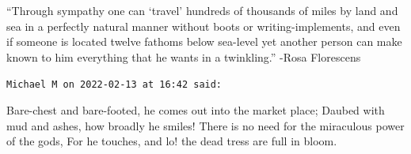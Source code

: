 \begin{footnotesize}
\begin{sffamily}
``Through sympathy one can `travel' hundreds of thousands of miles by land and sea in a perfectly natural manner without boots or writing-implements, and even if someone is located twelve fathoms below sea-level yet another person can make known to him everything that he wants in a twinkling.'' -Rosa Florescens

\hfill

\texttt{Michael M on 2022-02-13 at 16:42 said:}

Bare-chest and bare-footed, he comes out into the market place;
Daubed with mud and ashes, how broadly he smiles!
There is no need for the miraculous power of the gods,
For he touches, and lo! the dead tress are full in bloom.

\end{sffamily}
\end{footnotesize}

